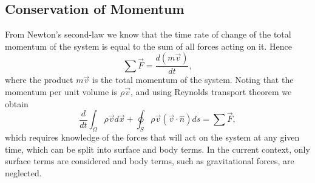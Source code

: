 \subsection{Conservation of Momentum}
From Newton's second-law we know that the time rate of change of the total momentum of the system is equal to the sum of all forces acting on it. Hence
\begin{equation}
	\sum \vec{F} = \frac{d(m \vec{v})}{dt},
\end{equation}
where the product $m \vec{v}$ is the total momentum of the system. Noting that the momentum per unit volume is $\rho \vec{v}$, and using Reynolds transport theorem we obtain
\begin{equation}
	 \frac{d}{dt}\int_\Omega \rho \vec{v} d\vec{x} + \oint_S \rho \vec{v} (\vec{v} \cdot \hat{n}) ds = \sum \vec{F},
\end{equation}
which requires knowledge of the forces that will act on the system at any given time, which can be split into surface and body terms. In the current context, only surface terms are considered and body terms, such as gravitational forces, are neglected.

